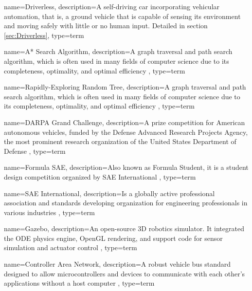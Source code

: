 {
    name=Driverless,
    description={A self-driving car incorporating vehicular automation, that is, a ground vehicle that is capable of sensing its environment and moving safely with little or no human input. Detailed in section \ref{sec:Driverless}},
    type=term
}

{
    name=A* Search Algorithm,
    description={A graph traversal and path search algorithm, which is often used in many fields of computer science due to its completeness, optimality, and optimal efficiency \cite{artificial_intelligence_a_modern_approach}},
    type=term
}

{
    name=Rapidly-Exploring Random Tree,
    description={A graph traversal and path search algorithm, which is often used in many fields of computer science due to its completeness, optimality, and optimal efficiency \cite{rapidly-exploring_random_trees} \cite{randomized_kinodynamic_planning}},
    type=term
}

{
    name=DARPA Grand Challenge,
    description={A prize competition for American autonomous vehicles, funded by the Defense Advanced Research Projects Agency, the most prominent research organization of the United States Department of Defense \cite{darpa_grand_challenge_online}},
    type=term
}

{
    name=Formula SAE,
    description={Also known as Formula Student, it is a student design competition organized by SAE International \cite{sae_student_events}},
    type=term
}

{
    name=SAE International,
    description={Is a globally active professional association and standards developing organization for engineering professionals in various industries \cite{formula_sae}},
    type=term
}

{
    name=Gazebo,
    description={An open-source 3D robotics simulator. It integrated the ODE physics engine, OpenGL rendering, and support code for sensor simulation and actuator control \cite{gazebo_simulator}},
    type=term
}

{
    name=Controller Area Network,
    description={A robust vehicle bus standard designed to allow microcontrollers and devices to communicate with each other's applications without a host computer \cite{history_of_can_technology}},
    type=term
}

